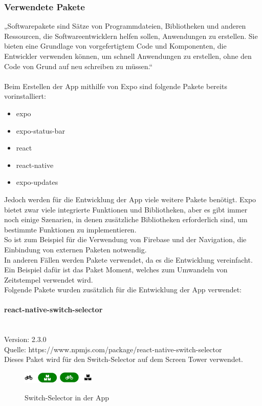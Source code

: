 \subsubsection{Verwendete Pakete}
„Softwarepakete sind Sätze von Programmdateien, Bibliotheken und anderen Ressourcen, die Softwareentwicklern helfen sollen, Anwendungen zu erstellen. Sie bieten eine Grundlage von vorgefertigtem Code und Komponenten, die Entwickler verwenden können, um schnell Anwendungen zu erstellen, ohne den Code von Grund auf neu schreiben zu müssen.“\cite{pakete} \\ \\
Beim Erstellen der App mithilfe von Expo sind folgende Pakete bereits vorinstalliert:\\
\begin{itemize}
    \item expo
    \item expo-status-bar
    \item react
    \item react-native
    \item expo-updates
\end{itemize}
Jedoch werden für die Entwicklung der App viele weitere Pakete benötigt. Expo bietet zwar viele integrierte Funktionen und Bibliotheken, aber es gibt immer noch einige Szenarien, in denen zusätzliche Bibliotheken erforderlich sind, um bestimmte Funktionen zu implementieren.\\
So ist zum Beispiel für die Verwendung von Firebase und der Navigation, die Einbindung von externen Paketen notwendig.\\
In anderen Fällen werden Pakete verwendet, da es die Entwicklung vereinfacht. Ein Beispiel dafür ist das Paket Moment, welches zum Umwandeln von Zeitstempel verwendet wird.\\
Folgende Pakete wurden zusätzlich für die Entwicklung der App verwendet:\\


\paragraph{react-native-switch-selector}\mbox{}\\
Version: 2.3.0\\ Quelle: https://www.npmjs.com/package/react-native-switch-selector\\
Dieses Paket wird für den Switch-Selector auf dem Screen Tower verwendet. \\  
\begin{figure}[H]
    \centering
    \includegraphics[width=0.15\textwidth]{images/app-screenshots/switchselector.png}
    \includegraphics[width=0.15\textwidth]{images/app-screenshots/switchselector2.png}
    \caption{Switch-Selector in der App}
    \label{fig:switchselector}
\end{figure}


